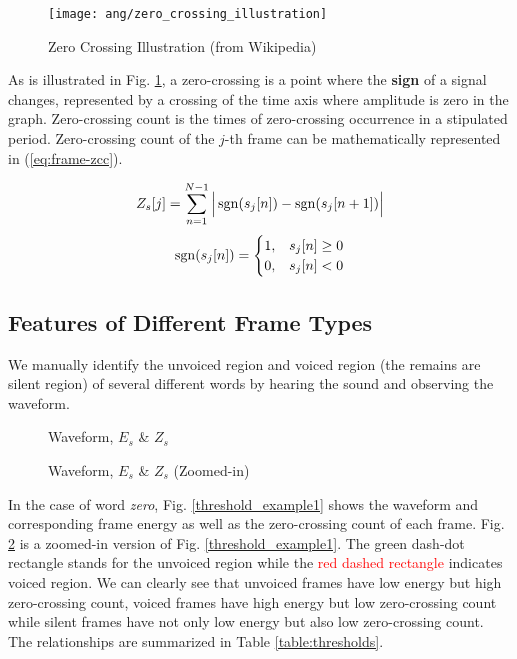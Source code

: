 \begin{figure}[H]
\centering
\texttt{[image: ang/zero\_crossing\_illustration]}
\caption{Zero Crossing Illustration (from Wikipedia)}
\label{zero_crossing_illustration}
\end{figure}

As is illustrated in Fig. \ref{zero_crossing_illustration}, a zero-crossing is a point where the \textbf{sign} of a signal changes, represented by a crossing of the time axis where amplitude is zero in the graph. Zero-crossing count is the times of zero-crossing occurrence in a stipulated period. Zero-crossing count of the $j$-th frame can be mathematically represented in (\ref{eq:frame-zcc}).

\begin{equation}
\label{eq:frame-zcc}
Z_s[j] = \sum_{n=1}^{N-1} \Big| \operatorname{sgn}(s_j[n]) - \operatorname{sgn}(s_j[n+1]) \Big|
\end{equation}
\begin{equation}
\operatorname{sgn}(s_j[n]) =
\begin{cases}
1, &s_j[n] \ge 0\\
0, &s_j[n] < 0
\end{cases}
\end{equation}


\subsection{Features of Different Frame Types}

We manually identify the unvoiced region and voiced region (the remains are silent region) of several different words by hearing the sound and observing the waveform.

\begin{figure}[H]
\begin{minipage}[t]{0.5\linewidth}
\centering
{}
\caption{Waveform, $E_s$ \& $Z_s$}
\label{threshold_example1}
\end{minipage}
\begin{minipage}[t]{0.5\linewidth}
\centering
{}
\caption{Waveform, $E_s$ \& $Z_s$ (Zoomed-in)}
\label{threshold_example2}
\end{minipage}
\end{figure}

In the case of word \textit{zero}, Fig. \ref{threshold_example1} shows the waveform and corresponding frame energy as well as the zero-crossing count of each frame. Fig. \ref{threshold_example2} is a zoomed-in version of Fig. \ref{threshold_example1}. The \textcolor{green_html}{green dash-dot rectangle} stands for the unvoiced region while the \textcolor{red}{red dashed rectangle} indicates voiced region. We can clearly see that unvoiced frames have low energy but high zero-crossing count, voiced frames have high energy but low zero-crossing count while silent frames have not only low energy but also low zero-crossing count. The relationships are summarized in Table \ref{table:thresholds}.

